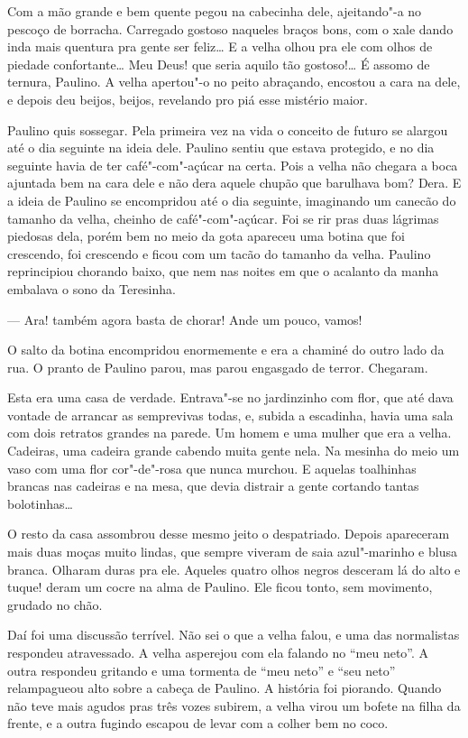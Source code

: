 Com a mão grande e bem quente pegou na cabecinha dele, ajeitando"-a no
pescoço de borracha. Carregado gostoso naqueles braços bons, com o xale
dando inda mais quentura pra gente ser feliz\ldots{} E a velha olhou pra ele
com olhos de piedade confortante\ldots{} Meu Deus! que seria aquilo tão
gostoso!\ldots{} É assomo de ternura, Paulino. A velha apertou"-o no peito
abraçando, encostou a cara na dele, e depois deu beijos, beijos,
revelando pro piá esse mistério maior.

Paulino quis sossegar. Pela primeira vez na vida o conceito de futuro se
alargou até o dia seguinte na ideia dele. Paulino sentiu que estava
protegido, e no dia seguinte havia de ter café"-com"-açúcar na certa. Pois
a velha não chegara a boca ajuntada bem na cara dele e não dera aquele
chupão que barulhava bom? Dera. E a ideia de Paulino se encompridou até
o dia seguinte, imaginando um canecão do tamanho da velha, cheinho de
café"-com"-açúcar. Foi se rir pras duas lágrimas piedosas dela, porém bem
no meio da gota apareceu uma botina que foi crescendo, foi crescendo e
ficou com um tacão do tamanho da velha. Paulino reprincipiou chorando
baixo, que nem nas noites em que o acalanto da manha embalava o sono da
Teresinha.

--- Ara! também agora basta de chorar! Ande um pouco, vamos!

O salto da botina encompridou enormemente e era a chaminé do outro lado
da rua. O pranto de Paulino parou, mas parou engasgado de terror.
Chegaram. 

Esta era uma casa de verdade. Entrava"-se no jardinzinho com flor, que
até dava vontade de arrancar as semprevivas todas, e, subida a
escadinha, havia uma sala com dois retratos grandes na parede. Um homem
e uma mulher que era a velha. Cadeiras, uma cadeira grande cabendo muita
gente nela. Na mesinha do meio um vaso com uma flor cor"-de"-rosa que
nunca murchou. E aquelas toalhinhas brancas nas cadeiras e na mesa, que
devia distrair a gente cortando tantas bolotinhas\ldots{}

O resto da casa assombrou desse mesmo jeito o despatriado. Depois
apareceram mais duas moças muito lindas, que sempre viveram de saia
azul"-marinho e blusa branca. Olharam duras pra ele. Aqueles quatro olhos
negros desceram lá do alto e tuque! deram um cocre na alma de Paulino.
Ele ficou tonto, sem movimento, grudado no chão.

Daí foi uma discussão terrível. Não sei o que a velha falou, e uma das
normalistas respondeu atravessado. A velha asperejou com ela falando no
``meu neto''. A outra respondeu gritando e uma tormenta de ``meu neto''
e ``seu neto'' relampagueou alto sobre a cabeça de Paulino. A história
foi piorando. Quando não teve mais agudos pras três vozes subirem, a
velha virou um bofete na filha da frente, e a outra fugindo escapou de
levar com a colher bem no coco.

